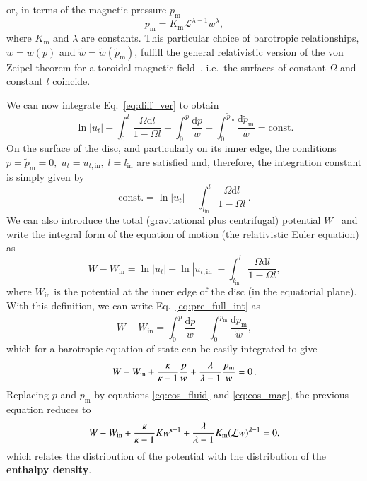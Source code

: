 \documentclass{aa}
\begin{document}
or, in terms of the magnetic pressure $p_{\mathrm{m}}$
\begin{equation}\label{eq:eos_mag}
p_{\mathrm{m}} = K_{\mathrm{m}} \mathcal{L}^{\lambda
-1} w^{\lambda
},
\end{equation}
where $K_{\mathrm{m}}$ and $\lambda
$ are constants.
This particular choice of barotropic relationships, $w = w(p)$ and $\tilde{w} = \tilde{w}(\tilde{p}_{\mathrm{m}})$, fulfill the general relativistic version of the von Zeipel theorem for a toroidal magnetic field~\citep{vonZeipel:1924, Zanotti:2015}, i.e.~the surfaces of constant $\Omega$ and constant $l$ coincide.

We can now integrate Eq.~\eqref{eq:diff_ver} to obtain
\begin{equation}\label{eq:pre_full_int}
\ln |u_t| - \int^l_0 \frac{\Omega \mathrm{d}l}{1 - \Omega l} + \int^p_0 \frac{\mathrm{d}p}{w} + \int_0^{\tilde{p}_{\mathrm{m}}} \frac{\mathrm{d}\tilde{p}_{\mathrm{m}}}{\tilde{w}} = \mathrm{const}.
\end{equation}
On the surface of the disc, and particularly on its inner edge, the conditions
$p = \tilde{p}_{\mathrm{m}} = 0, \; u_t = u_{t, \mathrm{in}}, \; l = l_{\mathrm{in}}$
are satisfied and, therefore, the integration constant is simply given by
\begin{equation}
\mathrm{const.} = \ln |u_t| - \int^l_{l_\mathrm{in}} \frac{\Omega \mathrm{d}l}{1 - \Omega l}\,.
\end{equation}
We can also introduce the total (gravitational plus centrifugal) potential $W$~\citep{Abramowicz:1978} and write the integral form of the equation of motion (the relativistic Euler equation) as
\begin{equation}\label{eq:potential}
W - W_{\mathrm{in}} = \ln|u_t| - \ln|u_{t,\mathrm{in}}| - \int^{l}_{l_{\mathrm{in}}} \frac{\Omega \mathrm{d}l}{1 - \Omega l},
\end{equation}
where $W_{\mathrm{in}}$ is the potential at the inner edge of the disc (in the equatorial plane). With this definition, we can write Eq.~\eqref{eq:pre_full_int} as
\begin{equation}\label{eq:full_int}
W - W_{\mathrm{in}} = \int^p_0 \frac{\mathrm{d}p}{w} + \int_0^{\tilde{p}_{\mathrm{m}}} \frac{\mathrm{d}\tilde{p}_{\mathrm{m}}}{\tilde{w}},
\end{equation}
which for a barotropic equation of state can be easily integrated to give
\begin{equation}\label{eq:pre_enthalpy_eq}
W - W_{\rm{in}} + \frac{\kappa}{\kappa - 1}\frac{p}{w} + \frac{\lambda
}{\lambda
 - 1}\frac{p_{\mathrm{m}}}{w} = 0\,.
\end{equation}
Replacing $p$ and $p_{\mathrm{m}}$ by equations \eqref{eq:eos_fluid} and \eqref{eq:eos_mag}, the previous equation reduces to
\begin{equation}\label{eq:enthalpy_eq}
W - W_{\rm{in}} + \frac{\kappa}{\kappa - 1} K w^{\kappa - 1} + \frac{\lambda
}{\lambda
 - 1}K_{\mathrm{m}}(\mathcal{L} w)^{\lambda
 - 1} = 0,
\end{equation}
which relates the distribution of the potential with the distribution of the {\bf enthalpy density}.
\end{document}
